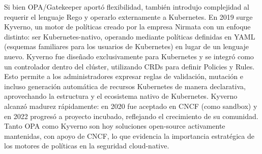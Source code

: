 \documentclass[12pt,twoside,titlepage]{report}
\begin{document}
Si bien OPA/Gatekeeper aportó flexibilidad, también introdujo complejidad al requerir el lenguaje Rego y operarlo externamente a Kubernetes. En 2019 surge Kyverno, un motor de políticas creado por la empresa Nirmata con un enfoque distinto: ser Kubernetes-nativo, operando mediante políticas definidas en YAML (esquemas familiares para los usuarios de Kubernetes) en lugar de un lenguaje nuevo. Kyverno fue diseñado exclusivamente para Kubernetes y se integró como un controlador dentro del clúster, utilizando CRDs para definir Policies y Rules. Esto permite a los administradores expresar reglas de validación, mutación e incluso generación automática de recursos Kubernetes de manera declarativa, aprovechando la estructura y el ecosistema nativo de Kubernetes. Kyverno alcanzó madurez rápidamente: en 2020 fue aceptado en CNCF (como sandbox) y en 2022 progresó a proyecto incubado, reflejando el crecimiento de su comunidad. Tanto OPA como Kyverno son hoy soluciones open-source activamente mantenidas, con apoyo de CNCF, lo que evidencia la importancia estratégica de los motores de políticas en la seguridad cloud-native. 
\end{document}
